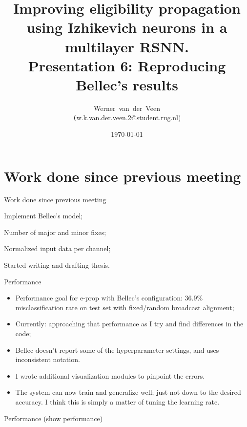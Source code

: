 \documentclass[t]{beamer}
\title[Eligibility propagation]{Improving eligibility propagation using Izhikevich neurons in a multilayer RSNN.\\\vspace{10pt}
\large{Presentation 6: Reproducing Bellec's results}}
\author[Werner]{Werner~van~der~Veen\\\footnotesize\texttt({w.k.van.der.veen.2@student.rug.nl})}\date{\today}
\newcommand{\cmark}{\ding{51}}%
\newcommand{\done}{\rlap{$\square$}{\raisebox{2pt}{\large\hspace{1pt}\cmark}}%
\hspace{-2.5pt}}
\begin{document}
\begin{frame}
    \titlepage
\end{frame}



\section{Work done since previous meeting}
\begin{frame}{Work done since previous meeting}
  \begin{todolist}

    \item[\done] Implement Bellec's model;
    \item[\done] Number of major and minor fixes;
    \item[\done] Normalized input data per channel;
    \item[\done] Started writing and drafting thesis.
  \end{todolist}

\end{frame}

\begin{frame}{Performance}
  \begin{itemize}[label=--]

    \item Performance goal for e-prop with Bellec's configuration: 36.9\% misclassification rate on test set with fixed/random broadcast alignment;
    \item Currently: approaching that performance as I try and find differences in the code;
    \item Bellec doesn't report some of the hyperparameter settings, and uses inconsistent notation.
    \item I wrote additional visualization modules to pinpoint the errors.
    \item The system can now train and generalize well; just not down to the desired accuracy. I think this is simply a matter of tuning the learning rate.
  \end{itemize}

\end{frame}


\begin{frame}{Performance}
\center
  (show performance)
\end{frame}
\end{document}
